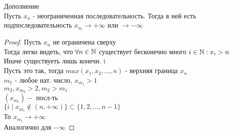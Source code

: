 Дополнение \\
Пусть $x_n$ - неограниченная последовательность. Тогда в ней есть подпоследовательность $ x_{n_i}  \rightarrow +\infty $ или $ \rightarrow -\infty $ \\
\begin{proof}
	Пусть $ x_n $ не ограничена сверху \\
	Тогда легко видеть, что $ \forall n \in \mathbb{N} $ существует бесконечно много $ i \in \mathbb{N} : x_i > n $ \\
	Иначе существуеть лишь конечн. i \\
	Пусть это так, тогда $ max(x_1, x_2, ..., n) $ - верхняя граница $x_n$\\
	$ m_1 $ - любое нат. число, $ x_{m_1} > 1 $ \\
	$ m_2, x_{m_2} > 2, m_2 > m_1 $ \\
	$ (x_{m_i})  -$ посл-ть \\
	$ \{i \mid x_{m_i} \notin (n, +\infty) \} \subset \{ 1,2,..., n-1 \} $ \\
	То $ x_{m_i} \rightarrow +\infty $\\
	Аналогично для $ -\infty $ 
\end{proof} 
\begin{consequence}
\end{consequence}

